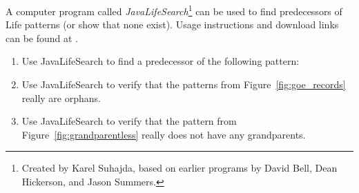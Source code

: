 \begin{multicols}{2}
	
	\mfilbreak
	
	
	\begin{problem}\label{exer:goe_jls}
		A computer program called \emph{JavaLifeSearch}\footnote{Created by Karel Suhajda, based on earlier programs by David Bell, Dean Hickerson, and Jason Summers.} can be used to find predecessors of Life patterns (or show that none exist). Usage instructions and download links can be found at .\smallskip
		
		\begin{enumerate}[label=\bf\color{ocre}(\alph*)]
			\item {} Use JavaLifeSearch to find a predecessor of the following pattern:
			
			\begin{center}
			\end{center}
			
			\item {} Use JavaLifeSearch to verify that the patterns from Figure~\ref{fig:goe_records} really are orphans.
			
			\item {} Use JavaLifeSearch to verify that the pattern from Figure~\ref{fig:grandparentless} really does not have any grandparents.
		\end{enumerate}
	\end{problem}
	
\end{multicols}
\normalsize\vspace*{0.01cm}
